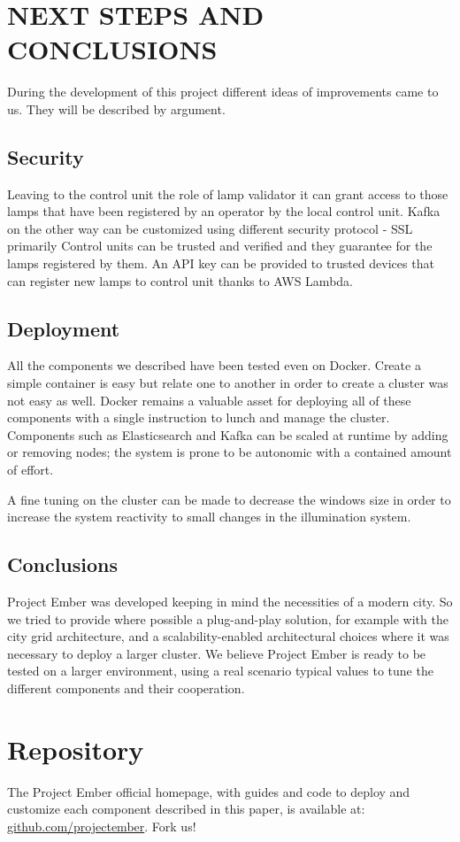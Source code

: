 \section{NEXT STEPS AND CONCLUSIONS}
During the development of this project different ideas of improvements came to us. They will be described by argument.

\subsection{Security}
Leaving to the control unit the role of lamp validator it can grant access to those lamps that have been registered by an operator by the local control unit. Kafka on the other way can be customized using different security protocol - SSL primarily Control units can be trusted and verified and they guarantee for the lamps registered by them. An API key can be provided to trusted devices that can register new lamps to control unit thanks to AWS Lambda. 

\subsection{Deployment}
All the components we described have been tested even on Docker. Create a simple container is easy but relate one to another in order to create a cluster was not easy as well. Docker remains a valuable asset for deploying all of these components with a single instruction to lunch and manage the cluster. Components such as Elasticsearch and Kafka can be scaled at runtime by adding or removing nodes; the system is prone to be autonomic with a contained amount of effort.

A fine tuning on the cluster can be made to decrease the windows size in order to increase the system reactivity to small changes in the illumination system.

\subsection{Conclusions}
Project Ember was developed keeping in mind the necessities of a modern city. So we tried to provide where possible a plug-and-play solution, for example with the city grid architecture, and a scalability-enabled architectural choices where it was necessary to deploy a larger cluster. We believe Project Ember is ready to be tested on a larger environment, using a real scenario typical values to tune the different components and their cooperation. 

\section*{Repository}
The Project Ember official homepage, with guides and code to deploy and customize each component described in this paper, is available at: \href{https://github.com/projectember}{github.com/projectember}. Fork us!

